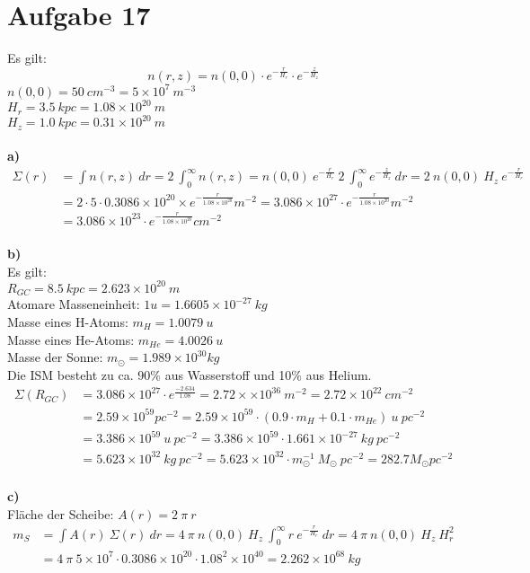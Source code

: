 \section{Aufgabe 17}

Es gilt:
\begin{equation}
n(r,z) = n(0,0) \cdot e^{-\frac{r}{H_r}} \cdot e^{-\frac{z}{H_z}}
\end{equation}
\(n(0,0) = 50~cm^{-3} = 5 \times 10^7~m^{-3}\)\\
\(H_r = 3.5~kpc = 1.08 \times 10^{20}~m\)\\
\(H_z = 1.0~kpc = 0.31 \times 10^{20}~m\)\\
\\
{\bfseries a)}
\begin{align}
\Sigma(r) &= \int{n(r,z)}~dr = 2~\int_0^\infty{n(r,z)} = n(0,0)~e^{-\frac{r}{H_r}}~2~\int_0^\infty{e^{-\frac{z}{H_z}}}~dr = 2~n(0,0)~H_z~e^{-\frac{r}{H_r}}\nonumber\\
&= 2 \cdot 5 \cdot 0.3086 \times 10^{20} \times e^{-\frac{r}{1.08 \times 10^{20}}} m^{-2} = 3.086 \times 10^{27} \cdot e^{-\frac{r}{1.08 \times 10^{20}}} m^{-2}\\
&= 3.086 \times 10^{23} \cdot e^{-\frac{r}{1.08 \times 10^{20}}} cm^{-2} \nonumber
\end{align}\\
{\bfseries b)}\\
Es gilt:\\
\(R_{GC} = 8.5~kpc = 2.623 \times 10^{20}~m\)\\
Atomare Masseneinheit: \(1 u = 1.6605 \times 10^{-27}~kg\)\\
Masse eines H-Atoms: \(m_H = 1.0079~u\)\\
Masse eines He-Atoms: \(m_{He} = 4.0026~u\)\\
Masse der Sonne: \(m_\odot = 1.989 \times 10^{30} kg\)\\
Die ISM besteht zu ca. 90\% aus Wasserstoff und 10\% aus Helium.
\begin{align}
\Sigma(R_{GC}) &= 3.086 \times 10^{27} \cdot e^{\frac{-2.634}{1.08}} = 2.72 \times \times 10^{36}~m^{-2} = 2.72 \times 10^{22}~cm^{-2}\\
&= 2.59 \times 10^{59} pc^{-2} = 2.59 \times 10^{59} \cdot (0.9\cdot m_H + 0.1\cdot m_{He})~u~pc^{-2}\nonumber\\
&= 3.386 \times 10^{59}~u~pc^{-2} = 3.386 \times 10^{59} \cdot 1.661 \times 10^{-27}~kg~pc^{-2}\nonumber\\
&= 5.623 \times 10^{32}~kg~pc^{-2} = 5.623 \times 10^{32}\cdot m_\odot^{-1}~M_\odot~pc^{-2} = 282.7 M_\odot pc^{-2}\nonumber
\end{align}\\
{\bfseries c)}\\
Fläche der Scheibe: \(A(r) = 2~\pi~r\)
\begin{align}
m_S &= \int{A(r)~\Sigma(r)~dr} = 4~\pi~n(0,0)~H_z~\int_0^\infty{r~e^{-\frac{r}{H_r}}~dr} = 4~\pi~n(0,0)~H_z~H_r^2\\
&= 4~\pi~5 \times 10^7 \cdot 0.3086 \times 10^{20} \cdot 1.08^2 \times 10^{40} = 2.262 \times 10^{68}~kg\nonumber
\end{align}\\
